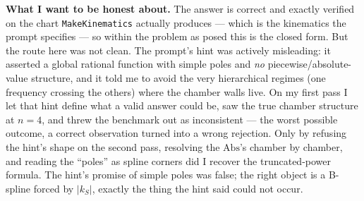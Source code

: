 \documentclass{article}
\begin{document}
\medskip
\noindent\textbf{What I want to be honest about.}\quad
The answer is correct and exactly verified on the chart \texttt{MakeKinematics}
actually produces --- which is the kinematics the prompt specifies --- so within
the problem as posed this is the closed form. But the route here was not clean.
The prompt's hint was actively misleading: it asserted a global rational function
with simple poles and \emph{no} piecewise/absolute-value structure, and it told
me to avoid the very hierarchical regimes (one frequency crossing the others)
where the chamber walls live. On my first pass I let that hint define what a
valid answer could be, saw the true chamber structure at $n=4$, and threw the
benchmark out as inconsistent --- the worst possible outcome, a correct
observation turned into a wrong rejection. Only by refusing the hint's shape on
the second pass, resolving the $\mathrm{Abs}$'s chamber by chamber, and reading
the ``poles'' as spline corners did I recover the truncated-power formula. The
hint's promise of simple poles was false; the right object is a B-spline forced by
$|k_S|$, exactly the thing the hint said could not occur.
\end{document}
